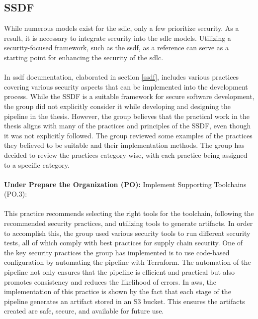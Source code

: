 \subsection{SSDF}
While numerous models exist for the \acrlong{sdlc}, only a few prioritize security. As a result, it is necessary to integrate security into the \acrshort{sdlc} models. Utilizing a security-focused framework, such as the \acrshort{ssdf}, as a reference can serve as a starting point for enhancing the security of the \acrshort{sdlc}. 
\\~\\
In \acrshort{ssdf} documentation, elaborated in section \ref{ssdf}, includes various practices covering various security aspects that can be implemented into the development process. While the SSDF is a suitable framework for secure software development, the group did not explicitly consider it while developing and designing the pipeline in the thesis. However, the group believes that the practical work in the thesis aligns with many of the practices and principles of the SSDF, even though it was not explicitly followed. The group reviewed some examples of the practices they believed to be suitable and their implementation methods. The group has decided to review the practices category-wise, with each practice being assigned to a specific category. 
\\~\\
\textbf{Under Prepare the Organization (PO):}
Implement Supporting Toolchains (PO.3): \textit{}\cite{ssdf}
\\~\\
This practice recommends selecting the right tools for the toolchain, following the recommended security practices, and utilizing tools to generate artifacts. In order to accomplish this, the group used various security tools to run different security tests, all of which comply with best practices for supply chain security. One of the key security practices the group has implemented is to use code-based configuration by automating the pipeline with Terraform. The automation of the pipeline not only ensures that the pipeline is efficient and practical but also promotes consistency and reduces the likelihood of errors. In \acrshort{aws}, the implementation of this practice is shown by the fact that each stage of the pipeline generates an artifact stored in an S3 bucket. This ensures the artifacts created are safe, secure, and available for future use.
